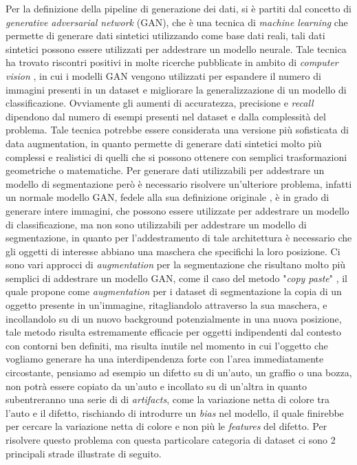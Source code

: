 Per la definizione della pipeline di generazione dei dati, si è partiti dal concetto di \textit{generative adversarial network} (GAN), che è una tecnica di \textit{machine learning}
che permette di generare dati sintetici utilizzando come base dati reali, tali dati sintetici possono essere utilizzati per addestrare un modello neurale.
Tale tecnica ha trovato riscontri positivi in molte ricerche pubblicate in ambito di \textit{computer vision} \cite{ganbasedaugexample}, in cui i modelli GAN vengono
utilizzati per espandere il numero di immagini presenti in un dataset e migliorare la generalizzazione di un modello di classificazione.
Ovviamente gli aumenti di accuratezza, precisione e \textit{recall} dipendono dal numero di esempi presenti nel dataset e dalla complessità del problema.
Tale tecnica potrebbe essere considerata una versione più sofisticata di data augmentation, in quanto permette di generare dati sintetici molto più complessi
e realistici di quelli che si possono ottenere con semplici trasformazioni geometriche o matematiche.
Per generare dati utilizzabili per addestrare un modello di segmentazione però è necessario risolvere un'ulteriore problema,
infatti un normale modello GAN, fedele alla sua definizione originale \cite{goodfellow2014generative} , è in grado di generare intere immagini,
che possono essere utilizzate per addestrare un modello di classificazione, ma non sono utilizzabili per addestrare un modello di segmentazione,
in quanto per l'addestramento di tale architettura è necessario che gli oggetti di interesse abbiano una maschera che specifichi la loro posizione.
Ci sono vari approcci di \textit{augmentation} per la segmentazione che risultano molto più semplici di addestrare un modello GAN, come il caso del metodo "\textit{copy paste}" \cite{ghiasi2021simple},
il quale propone come \textit{augmentation} per i dataset di segmentazione la copia di un oggetto presente in un'immagine, ritagliandolo attraverso la sua maschera,
e incollandolo su di un nuovo background potenzialmente in una nuova posizione, tale metodo risulta estremamente efficacie per oggetti indipendenti dal contesto con contorni ben definiti,
ma risulta inutile nel momento in cui l'oggetto che vogliamo generare ha una interdipendenza forte con l'area immediatamente circostante,
pensiamo ad esempio un difetto su di un'auto, un graffio o una bozza, non potrà essere copiato da un'auto e incollato su di un'altra in quanto subentreranno una serie di
di \textit{artifacts}, come la variazione netta di colore tra l'auto e il difetto, rischiando di introdurre un \textit{bias} nel modello, il quale finirebbe per cercare la variazione netta di colore
e non più le \textit{features} del difetto. Per risolvere questo problema con questa particolare categoria di dataset ci sono 2 principali strade illustrate di seguito.

